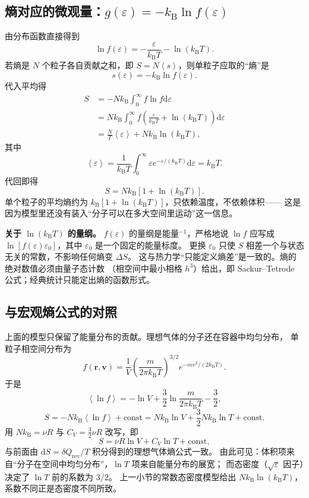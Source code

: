 \documentclass[11pt,a4paper,openany]{ctexbook}
\newcommand{\dd}{\mathrm d}
\newcommand{\kb}{k_{\mathrm B}}
\newcommand{\avg}[1]{\left\langle #1\right\rangle}
\newcommand{\rev}{\mathrm{rev}}
\newcommand{\const}{\mathrm{const}}
\newcommand{\vv}{\bm{v}}
\newcommand{\vr}{\bm{r}}
\begin{document}
\subsection*{熵对应的微观量：$g(\varepsilon)=-\kb\ln f(\varepsilon)$}
由分布函数直接得到
\[
\ln f(\varepsilon)=-\frac{\varepsilon}{\kb T}-\ln(\kb T).
\]
若熵是 $N$ 个粒子各自贡献之和，即 $S=N\avg{s}$，则单粒子应取的“熵”是
\[
s(\varepsilon)=-\kb\ln f(\varepsilon).
\]
代入平均得
\[
\begin{aligned}
S&=-N\kb\int_0^\infty f\ln f\dd\varepsilon\\
&=N\kb\int_0^\infty f\left(\frac{\varepsilon}{\kb T}+\ln(\kb T)\right)\dd\varepsilon\\
&=\frac{N}{T}\avg{\varepsilon}+N\kb\ln(\kb T),
\end{aligned}
\]
其中
\[
\avg{\varepsilon}
=\frac{1}{\kb T}\int_0^\infty\varepsilon e^{-\varepsilon/(\kb T)}\dd\varepsilon
=\kb T .
\]
代回即得
\[
\boxed{S=N\kb\left[1+\ln(\kb T)\right]}.
\]
单个粒子的平均熵约为 $\kb\left[1+\ln(\kb T)\right]$，只依赖温度，不依赖体积——
这是因为模型里还没有装入“分子可以在多大空间里运动”这一信息。

\begin{notebox}
\textbf{关于 $\ln(\kb T)$ 的量纲。}
$f(\varepsilon)$ 的量纲是能量$^{-1}$，严格地说 $\ln f$ 应写成
$\ln\left[f(\varepsilon)\varepsilon_0\right]$，其中 $\varepsilon_0$ 是一个固定的能量标度。
更换 $\varepsilon_0$ 只使 $S$ 相差一个与状态无关的常数，不影响任何熵变 $\Delta S$。
这与热力学“只能定义熵差”是一致的。熵的绝对数值必须由量子态计数
（相空间中最小相格 $h^3$）给出，即 Sackur--Tetrode 公式；经典统计只能定出熵的函数形式。
\end{notebox}

\subsection*{与宏观熵公式的对照}
上面的模型只保留了能量分布的贡献。理想气体的分子还在容器中均匀分布，
单粒子相空间分布为
\[
f(\vr,\vv)=\frac{1}{V}\left(\frac{m}{2\pi\kb T}\right)^{3/2}
e^{-mv^2/(2\kb T)} .
\]
于是
\[
\avg{\ln f}
=-\ln V+\frac32\ln\frac{m}{2\pi\kb T}-\frac32,
\]
\[
S=-N\kb\avg{\ln f}+\const
=N\kb\ln V+\frac32N\kb\ln T+\const .
\]
用 $N\kb=\nu R$ 与 $C_V=\frac32\nu R$ 改写，即
\[
\boxed{S=\nu R\ln V+C_V\ln T+\const },
\]
与前面由 $\dd S=\delta Q_{\rev}/T$ 积分得到的理想气体熵公式一致。
由此可见：体积项来自“分子在空间中均匀分布”，$\ln T$ 项来自能量分布的展宽；
而态密度（$\sqrt{\varepsilon}$ 因子）决定了 $\ln T$ 前的系数为 $3/2$。
上一小节的常数态密度模型给出 $N\kb\ln(\kb T)$，系数不同正是态密度不同所致。
\end{document}
